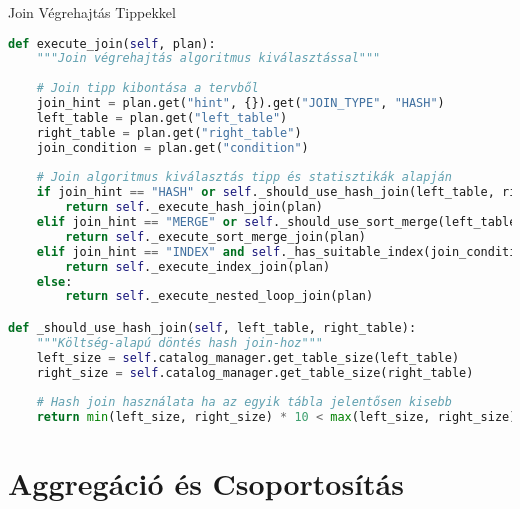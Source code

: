 \documentclass[aspectratio=169]{beamer}
\begin{document}
\begin{frame}[fragile]{Join Végrehajtás Tippekkel}
\begin{lstlisting}[language=Python]
def execute_join(self, plan):
    """Join végrehajtás algoritmus kiválasztással"""
    
    # Join tipp kibontása a tervből
    join_hint = plan.get("hint", {}).get("JOIN_TYPE", "HASH")
    left_table = plan.get("left_table")
    right_table = plan.get("right_table")
    join_condition = plan.get("condition")
    
    # Join algoritmus kiválasztás tipp és statisztikák alapján
    if join_hint == "HASH" or self._should_use_hash_join(left_table, right_table):
        return self._execute_hash_join(plan)
    elif join_hint == "MERGE" or self._should_use_sort_merge(left_table, right_table):
        return self._execute_sort_merge_join(plan)
    elif join_hint == "INDEX" and self._has_suitable_index(join_condition):
        return self._execute_index_join(plan)
    else:
        return self._execute_nested_loop_join(plan)

def _should_use_hash_join(self, left_table, right_table):
    """Költség-alapú döntés hash join-hoz"""
    left_size = self.catalog_manager.get_table_size(left_table)
    right_size = self.catalog_manager.get_table_size(right_table)
    
    # Hash join használata ha az egyik tábla jelentősen kisebb
    return min(left_size, right_size) * 10 < max(left_size, right_size)
\end{lstlisting}
\end{frame}

\section{Aggregáció és Csoportosítás}
\end{document}

